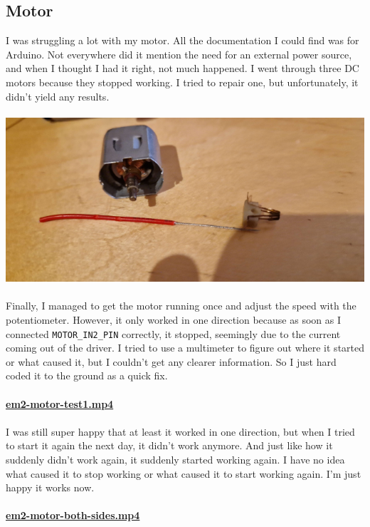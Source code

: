 \subsection{Motor}
I was struggling a lot with my motor. All the documentation I could find was for Arduino. Not everywhere did it mention the need for an external power source, and when I thought I had it right, not much happened. I went through three DC motors because they stopped working. I tried to repair one, but unfortunately, it didn't yield any results. 
\\ \\
\includegraphics[scale=0.5]{img/motor.png}
\\ \\
Finally, I managed to get the motor running once and adjust the speed with the potentiometer. However, it only worked in one direction because as soon as I connected \texttt{MOTOR\_IN2\_PIN} correctly, it stopped, seemingly due to the current coming out of the driver. I tried to use a multimeter to figure out where it started or what caused it, but I couldn't get any clearer information. So I just hard coded it to the ground as a quick fix.
\\ \\ 
\href{https://drive.google.com/file/d/1rd44Cz8T1Gg5iTYCPDCrZmAVjVKYmPvb/view?usp=sharing}{\textbf{em2-motor-test1.mp4}}
\\ \\ 
I was still super happy that at least it worked in one direction, but when I tried to start it again the next day, it didn't work anymore. And just like how it suddenly didn't work again, it suddenly started working again. I have no idea what caused it to stop working or what caused it to start working again. I'm just happy it works now.
\\ \\ 
\href{https://drive.google.com/file/d/1BRR4opuRYfXWmIPmIqXvLAS7DdbljeMK/view?usp=sharing}{\textbf{em2-motor-both-sides.mp4}}
\\ \\ 
